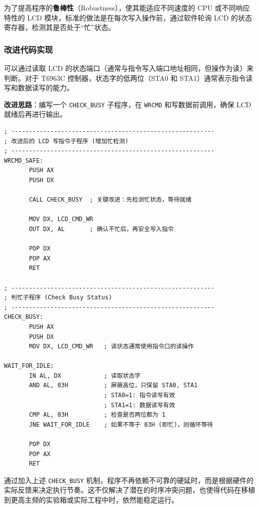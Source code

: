 \documentclass[UTF8]{article}
\begin{document}
为了提高程序的\textbf{鲁棒性}（Robustness），使其能适应不同速度的 CPU 或不同响应特性的 LCD 模块，标准的做法是在每次写入操作前，通过软件轮询 LCD 的状态寄存器，检测其是否处于“忙”状态。

\subsubsection{改进代码实现}
可以通过读取 LCD 的状态端口（通常与指令写入端口地址相同，但操作为读）来判断。对于 T6963C 控制器，状态字的低两位（STA0 和 STA1）通常表示指令读写和数据读写的能力。

\textbf{改进思路}：编写一个 \texttt{CHECK\_BUSY} 子程序，在 \texttt{WRCMD} 和写数据前调用，确保 LCD 就绪后再进行输出。

\begin{lstlisting}[language={[x86masm]Assembler}]
; ---------------------------------------------------------
; 改进后的 LCD 写指令子程序 (增加忙检测)
; ---------------------------------------------------------
WRCMD_SAFE: 
       PUSH AX
       PUSH DX
       
       CALL CHECK_BUSY  ; 关键改进：先检测忙状态，等待就绪
       
       MOV DX, LCD_CMD_WR
       OUT DX, AL       ; 确认不忙后，再安全写入指令
       
       POP DX
       POP AX
       RET

; ---------------------------------------------------------
; 判忙子程序 (Check Busy Status)
; ---------------------------------------------------------
CHECK_BUSY:
       PUSH AX
       PUSH DX
       MOV DX, LCD_CMD_WR   ; 读状态通常使用指令口的读操作
       
WAIT_FOR_IDLE:
       IN AL, DX            ; 读取状态字
       AND AL, 03H          ; 屏蔽高位，只保留 STA0, STA1
                            ; STA0=1: 指令读写有效
                            ; STA1=1: 数据读写有效
       CMP AL, 03H          ; 检查是否两位都为 1
       JNE WAIT_FOR_IDLE    ; 如果不等于 03H (即忙)，则循环等待
       
       POP DX
       POP AX
       RET
\end{lstlisting}

\begin{bluebox}
通过加入上述 \texttt{CHECK\_BUSY} 机制，程序不再依赖不可靠的硬延时，而是根据硬件的实际反馈来决定执行节奏。这不仅解决了潜在的时序冲突问题，也使得代码在移植到更高主频的实验箱或实际工程中时，依然能稳定运行。
\end{bluebox}
\end{document}
